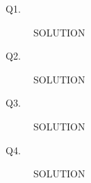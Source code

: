 \documentclass[11pt]{csc_assignment}
\begin{document}
\begin{description}


\item[Q1.]


SOLUTION




\newpage
\item[Q2.]


SOLUTION





\newpage
\item[Q3.]


SOLUTION





\newpage
\item[Q4.]


SOLUTION




\end{description}
\end{document}
